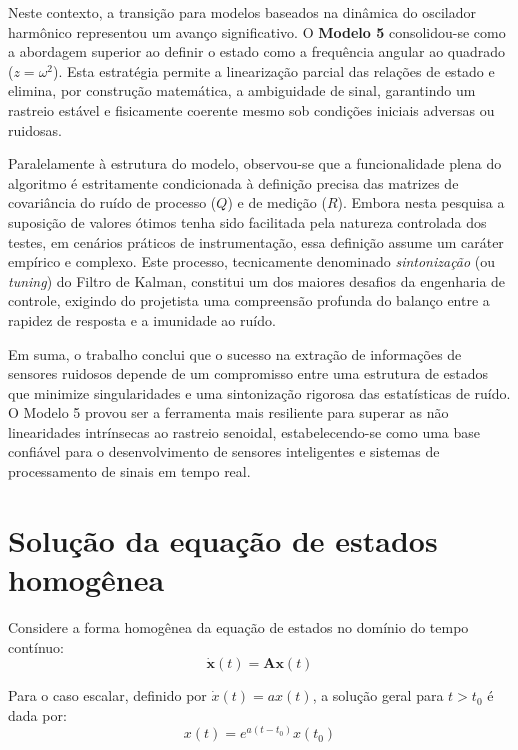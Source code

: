 \documentclass[a4paper,12pt]{article}
\begin{document}
Neste contexto, a transição para modelos baseados na dinâmica do oscilador harmônico representou um avanço significativo. O \textbf{Modelo 5} consolidou-se como a abordagem superior ao definir o estado como a frequência angular ao quadrado ($z = \omega^2$). Esta estratégia permite a linearização parcial das relações de estado e elimina, por construção matemática, a ambiguidade de sinal, garantindo um rastreio estável e fisicamente coerente mesmo sob condições iniciais adversas ou ruidosas.

Paralelamente à estrutura do modelo, observou-se que a funcionalidade plena do algoritmo é estritamente condicionada à definição precisa das matrizes de covariância do ruído de processo ($Q$) e de medição ($R$). Embora nesta pesquisa a suposição de valores ótimos tenha sido facilitada pela natureza controlada dos testes, em cenários práticos de instrumentação, essa definição assume um caráter empírico e complexo. Este processo, tecnicamente denominado \textit{sintonização} (ou \textit{tuning}) do Filtro de Kalman, constitui um dos maiores desafios da engenharia de controle, exigindo do projetista uma compreensão profunda do balanço entre a rapidez de resposta e a imunidade ao ruído.

Em suma, o trabalho conclui que o sucesso na extração de informações de sensores ruidosos depende de um compromisso entre uma estrutura de estados que minimize singularidades e uma sintonização rigorosa das estatísticas de ruído. O Modelo 5 provou ser a ferramenta mais resiliente para superar as não linearidades intrínsecas ao rastreio senoidal, estabelecendo-se como uma base confiável para o desenvolvimento de sensores inteligentes e sistemas de processamento de sinais em tempo real.

\newpage 

\newpage

\appendix
\section{Solução da equação de estados homogênea}
\label{anm:solucao_edo}

Considere a forma homogênea da equação de estados no domínio do tempo contínuo:
\begin{equation}
    \dot{\mathbf{x}}(t) = \mathbf{A}\mathbf{x}(t)
    \label{eq:homoEQ}
\end{equation}

Para o caso escalar, definido por $\dot{x}(t) = ax(t)$, a solução geral para $t > t_0$ é dada por:
\begin{equation}
    x(t) = e^{a(t-t_0)}x(t_0)
\end{equation}
\end{document}
